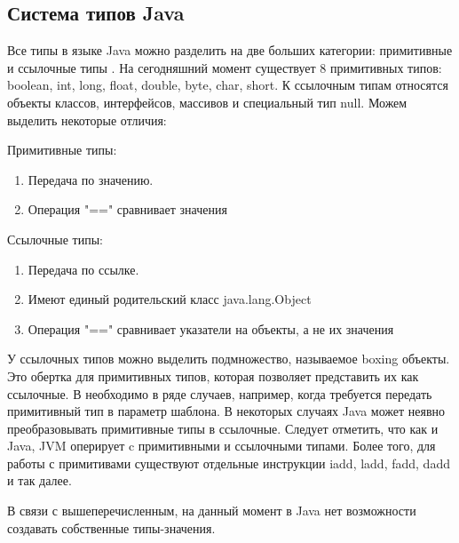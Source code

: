 \subsection{Система типов Java}
Все типы в языке Java можно разделить на две больших категории: примитивные и ссылочные типы \cite{java-spec}. На сегодняшний момент существует 8 примитивных типов: boolean, int,
long, float, double, byte, char, short. К ссылочным типам относятся объекты классов, интерфейсов, массивов и специальный тип null. Можем выделить некоторые отличия:
\par
Примитивные типы:
\begin{enumerate}
	\item Передача по значению.
	\item Операция "==" сравнивает значения 
\end{enumerate}
Ссылочные типы:
\begin{enumerate}
	\item Передача по ссылке.
	\item Имеют единый родительский класс java.lang.Object
	\item Операция "==" сравнивает указатели на объекты, а не их значения
\end{enumerate}
У ссылочных типов можно выделить подмножество, называемое boxing объекты. Это обертка для примитивных типов, которая позволяет представить их как ссылочные. В необходимо в ряде случаев, например, когда требуется передать примитивный тип в параметр шаблона. В некоторых случаях Java может неявно преобразовывать примитивные типы в ссылочные.
Следует отметить, что как и Java, JVM оперирует c примитивными и ссылочными типами\cite{jvm-spec}. Более того, для работы с примитивами существуют отдельные инструкции iadd, ladd, fadd, dadd и так далее.
\par
В связи с вышеперечисленным, на данный момент в Java нет возможности создавать собственные типы-значения.

\clearpage
